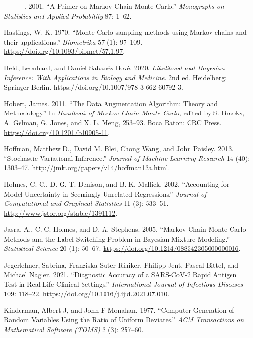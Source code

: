 \documentclass[
  11pt,
  letterpaper,
]{scrbook}
\newlength{\cslhangindent}
\newenvironment{CSLReferences}[2] %
 {\begin{list}{}{%
  \setlength{\itemindent}{0pt}
  \setlength{\leftmargin}{0pt}
  \setlength{\parsep}{0pt}
  \ifodd #1
   \setlength{\leftmargin}{\cslhangindent}
   \setlength{\itemindent}{-1\cslhangindent}
  \fi
  \setlength{\itemsep}{#2\baselineskip}}}
 {\end{list}}
\theoremstyle{plain}
\theoremstyle{definition}
\theoremstyle{definition}
\theoremstyle{plain}
\theoremstyle{plain}
\theoremstyle{definition}
\theoremstyle{remark}
\begin{document}
\begin{CSLReferences}{1}{0}
---------. 2001. {``A Primer on {M}arkov Chain {M}onte {C}arlo.''}
\emph{Monographs on Statistics and Applied Probability} 87: 1--62.

Hastings, W. K. 1970. {``{Monte {C}arlo sampling methods using {M}arkov
chains and their applications}.''} \emph{Biometrika} 57 (1): 97--109.
\url{https://doi.org/10.1093/biomet/57.1.97}.

Held, Leonhard, and Daniel Sabanés Bové. 2020. \emph{Likelihood and
{B}ayesian Inference: With Applications in Biology and Medicine}. 2nd
ed. Heidelberg: Springer Berlin.
\url{https://doi.org/10.1007/978-3-662-60792-3}.

Hobert, James. 2011. {``The Data Augmentation Algorithm: Theory and
Methodology.''} In \emph{Handbook of {M}arkov Chain {M}onte {C}arlo},
edited by S. Brooks, A. Gelman, G. Jones, and X. L. Meng, 253--93. Boca
Raton: CRC Press. \url{https://doi.org/10.1201/b10905-11}.

Hoffman, Matthew D., David M. Blei, Chong Wang, and John Paisley. 2013.
{``Stochastic Variational Inference.''} \emph{Journal of Machine
Learning Research} 14 (40): 1303--47.
\url{http://jmlr.org/papers/v14/hoffman13a.html}.

Holmes, C. C., D. G. T. Denison, and B. K. Mallick. 2002. {``Accounting
for Model Uncertainty in Seemingly Unrelated Regressions.''}
\emph{Journal of Computational and Graphical Statistics} 11 (3):
533--51. \url{http://www.jstor.org/stable/1391112}.

Jasra, A., C. C. Holmes, and D. A. Stephens. 2005. {``{M}arkov Chain
{M}onte {C}arlo Methods and the Label Switching Problem in {B}ayesian
Mixture Modeling.''} \emph{Statistical Science} 20 (1): 50--67.
\url{https://doi.org/10.1214/088342305000000016}.

Jegerlehner, Sabrina, Franziska Suter-Riniker, Philipp Jent, Pascal
Bittel, and Michael Nagler. 2021. {``Diagnostic Accuracy of a
{SARS-CoV-2} Rapid Antigen Test in Real-Life Clinical Settings.''}
\emph{International Journal of Infectious Diseases} 109: 118--22.
\url{https://doi.org/10.1016/j.ijid.2021.07.010}.

Kinderman, Albert J, and John F Monahan. 1977. {``Computer Generation of
Random Variables Using the Ratio of Uniform Deviates.''} \emph{ACM
Transactions on Mathematical Software (TOMS)} 3 (3): 257--60.


\end{CSLReferences}
\end{document}
